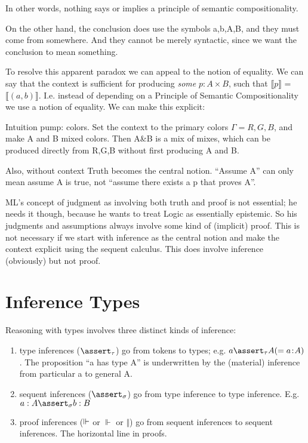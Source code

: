 \documentclass{article}
\begin{document}
In other words, nothing says or implies a principle of semantic
compositionality.

On the other hand, the conclusion does use the symbols a,b,A,B, and
they must come from somewhere. And they cannot be merely syntactic,
since we want the conclusion to mean something.

To resolve this apparent paradox we can appeal to the notion of
equality. We can say that the context is sufficient for producing
\textit{some} \(p:A\times B\), such that \(\llbracket p\rrbracket\) =
\(\llbracket(a,b)\rrbracket\). I.e. instead of depending on a
Principle of Semantic Compositionality we use a notion of equality. We
can make this explicit:


Intuition pump: colors. Set the context to the primary colors \(\Gamma
= R,G,B\), and make A and B mixed colors. Then A\&B is a mix of mixes,
which can be produced directly from R,G,B without first producing A and
B.

Also, without context Truth becomes the central notion. ``Assume A''
can only mean assume A is true, not ``assume there exists a p that
proves A''.

ML's concept of judgment as involving both truth and proof is not
essential; he needs it though, because he wants to treat Logic as
essentially epistemic. So his judgments and assumptions always involve
some kind of (implicit) proof. This is not necessary if we start with
inference as the central notion and make the context explicit using
the sequent calculus. This does involve inference (obviously) but not
proof.

\section{Inference Types}

Reasoning with types involves three distinct kinds of inference:

\begin{enumerate}
\item type inferences (\(\tinfer\)) go from tokens to types; e.g. \(a\tinfer
  A (= \mbox{\tj{a}{A}})\). The proposition ``a has type A'' is underwritten by the
  (material) inference from particular a to general A.
\item sequent inferences (\(\sso\)) go from type inference to type inference.  E.g. \(a:A\sso b:B\)
\item proof inferences (\(\Vdash\) or \(\Vdash\) or  \(\Vert\)) go
  from sequent inferences to sequent inferences. The horizontal line
  in proofs.
\end{enumerate}
\end{document}
